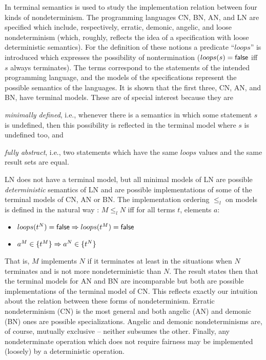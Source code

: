 {In \cite{c:21} terminal semantics is used to study the implementation relation between four kinds of 
nondeterminism. The programming languages CN, BN, AN, and LN are specified which include, 
respectively, erratic, demonic, angelic, and loose nondeterminism (which, roughly, reflects the idea of a 
specification with loose deterministic semantics). For the definition of these notions a 
predicate ``$loops$'' is 
introduced which expresses the possibility of nontermination 
($loops(s)={\sf false}$ iff $s$ always terminates). The 
terms correspond to the statements of the intended programming language, and the models of the 
specifications represent the possible semantics of the languages. It is shown that the first three, CN, AN, 
and BN, have terminal models. These are of special interest because they are
\begin{enum}
\item {\em minimally defined}, i.e., whenever there is a semantics in which some statement $s$ is 
undefined, then this possibility is reflected in the terminal model where 
$s$ is undefined too, 
and
\item {\em fully abstract}, i.e., two statements which have the same 
$loops$ values and the same result sets are equal.  
\end{enum}
LN does not have a terminal model, but all minimal models of LN are 
possible {\em deterministic} semantics of 
LN and are possible implementations of some of the terminal models of CN, AN or BN.  The 
implementation ordering $\leq_{l}$ on models is defined in the natural way \cite{c:93, c:53, c:18}: 
$M \leq_{l} N$  iff  for all terms $t$, elements $a$:
\begin{itemize}\MyLPar 
\item[{}] $loops(t^{N})={\sf false} \mathrel{\Rightarrow} loops(t^{M})={\sf false}$	
\item[{}]  $a^{M} \in \{t^{M}\}\mathrel{\Rightarrow} a^{N}\in \{t^{N}\}$ 
\end{itemize}
That is, $M$ implements $N$ if it terminates at least in the situations when $N$ terminates and is not more 
nondeterministic than $N$. The result states then that the terminal models for AN and BN are incomparable 
but both are possible implementations of the terminal model of CN. This reflects exactly our intuition 
about the relation between these forms of nondeterminism. Erratic nondeterminism (CN) is the most 
general and both angelic (AN) and demonic (BN) ones are possible specializations. Angelic and demonic 
nondeterminisms are, of course, mutually exclusive -- neither subsumes the other. Finally, any 
nondeterminate operation which does not require fairness may be implemented (loosely) by a 
deterministic operation.

}
